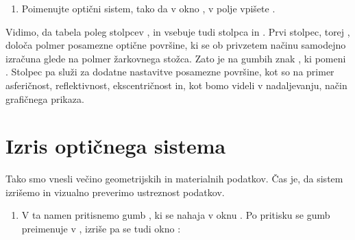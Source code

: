 \documentclass[letterpaper,10pt,english]{sphinxmanual}
\begin{document}
\begin{figure}[htbp]
\centering

\noindent{}
\end{figure}
\begin{enumerate}
%
\setcounter{enumi}{7}
\item {} 
\sphinxAtStartPar
Poimenujte optični sistem, tako da v okno , v polje  vpišete .

\end{enumerate}

\begin{figure}[htbp]
\centering

\noindent{}
\end{figure}

\sphinxAtStartPar
Vidimo, da tabela poleg stolpcev ,  in  vsebuje tudi stolpca  in . Prvi stolpec, torej , določa polmer posamezne optične površine, ki se ob privzetem načinu samodejno izračuna glede na polmer žarkovnega stožca. Zato je na gumbih znak , ki pomeni . Stolpec  pa služi za dodatne nastavitve posamezne površine, kot so na primer asferičnost, reflektivnost, ekscentričnost in, kot bomo videli v nadaljevanju, način grafičnega prikaza.


\section{Izris optičnega sistema}
\label{\detokenize{oslo:izris-opticnega-sistema}}
\sphinxAtStartPar
Tako smo vnesli večino geometrijskih in materialnih podatkov. Čas je, da sistem izrišemo in
vizualno preverimo ustreznost podatkov.
\begin{enumerate}
%
\item {} 
\sphinxAtStartPar
V ta namen pritisnemo gumb , ki se nahaja v oknu . Po pritisku se gumb preimenuje v , izriše pa se tudi okno :

\end{enumerate}
\end{document}
